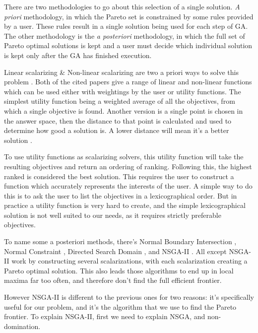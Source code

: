\documentclass[11pt]{article}
\begin{document}
    There are two methodologies to go about this selection of a single solution. \textit{A priori}
    methodology, in which the Pareto set is constrained by some rules provided by a user.
    These rules result in a single solution being used for each step of GA. The other
    methodology is the \textit{a posteriori} methodology, in which
    the full set of Pareto optimal solutions is kept and a user must decide which individual
    solution is kept only after the GA has finished execution.

    Linear scalarizing \& Non-linear scalarizing are two a priori ways to solve this problem
    \cite{KaisaMarko, Moffaert}. Both of the cited papers give a range of linear and non-linear
    functions which can be used either with weightings by the user or utility functions.
    The simplest utility function being a weighted average of all the objectives, from
    which a single objective is found. Another version is a single point is chosen
    in the answer space, then the distance to that point is calculated and used to
    determine how good a solution is. A lower distance will mean it's a better solution
    \cite{Buchanan}.

    To use utility functions as scalarizing solvers, this utility function will take
    the resulting objectives and return an ordering of ranking. Following this, the highest
    ranked is considered the best solution. This requires the user to construct
    a function which accurately represents the interests of the user. A simple way
    to do this is to ask the user to list the objectives in a lexicographical order.
    But in practice a utility function is very hard to create, and the simple
    lexicographical solution is not well suited to our needs, as it requires
    strictly preferable objectives.

    To name some a posteriori methods, there's Normal Boundary Intersection \cite{Indraneel},
    Normal Constraint \cite{Messac}, Directed Search Domain \cite{Tohid}, and NSGA-II
    \cite{DebPratapAgarwalMeyarivan}. All except NSGA-II work by constructing several
    scalarizations, with each scalarization creating a Pareto optimal solution.
    This also leads those algorithms to end up in local maxima far too often, and therefore
    don't find the full efficient frontier.

    However NSGA-II is different to the previous ones for two reasons: it's specifically useful for our
    problem, and it's the algorithm that
    we use to find the Pareto frontier. To explain NSGA-II, first we need to explain
    NSGA, and non-domination.
\end{document}
